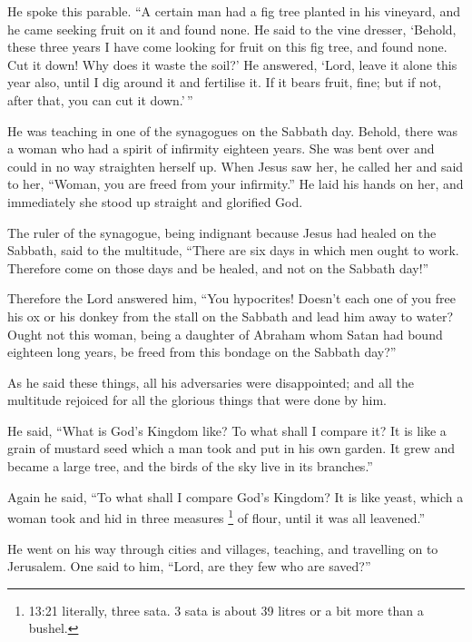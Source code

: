  He spoke this parable. ``A certain man had a fig tree
planted in his vineyard, and he came seeking fruit on it and found none.
 He said to the vine dresser, `Behold, these three years I
have come looking for fruit on this fig tree, and found none. Cut it
down! Why does it waste the soil?'  He answered, `Lord,
leave it alone this year also, until I dig around it and fertilise it.
 If it bears fruit, fine; but if not, after that, you can
cut it down.'\,''

 He was teaching in one of the synagogues on the Sabbath
day.  Behold, there was a woman who had a spirit of
infirmity eighteen years. She was bent over and could in no way
straighten herself up.  When Jesus saw her, he called her
and said to her, ``Woman, you are freed from your infirmity.''
 He laid his hands on her, and immediately she stood up
straight and glorified God.

 The ruler of the synagogue, being indignant because Jesus
had healed on the Sabbath, said to the multitude, ``There are six days
in which men ought to work. Therefore come on those days and be healed,
and not on the Sabbath day!''

 Therefore the Lord answered him, ``You hypocrites! Doesn't
each one of you free his ox or his donkey from the stall on the Sabbath
and lead him away to water?  Ought not this woman, being a
daughter of Abraham whom Satan had bound eighteen long years, be freed
from this bondage on the Sabbath day?''

 As he said these things, all his adversaries were
disappointed; and all the multitude rejoiced for all the glorious things
that were done by him.

 He said, ``What is God's Kingdom like? To what shall I
compare it?  It is like a grain of mustard seed which a man
took and put in his own garden. It grew and became a large tree, and the
birds of the sky live in its branches.''

 Again he said, ``To what shall I compare God's Kingdom?
 It is like yeast, which a woman took and hid in three
measures \footnote{13:21 literally, three sata. 3 sata is about 39
  litres or a bit more than a bushel.} of flour, until it was all
leavened.''

 He went on his way through cities and villages, teaching,
and travelling on to Jerusalem.  One said to him, ``Lord,
are they few who are saved?''

